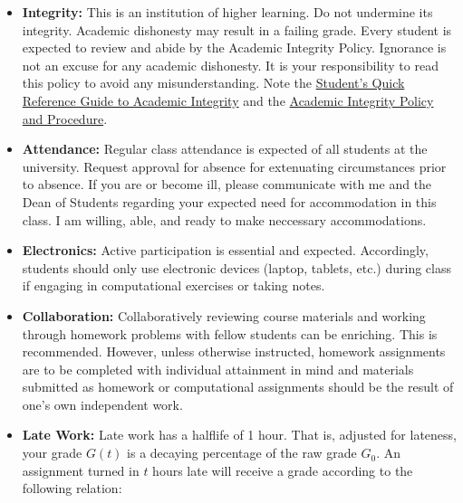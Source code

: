 \documentclass[11pt, a4paper]{article}
\begin{document}
\begin{itemize}
\item[] \textbf{Integrity:} This is an institution of higher learning.
        Do not undermine its integrity. Academic dishonesty may result in a failing grade. 
                Every student is expected to review and abide by the Academic 
                Integrity Policy. Ignorance is not an excuse for any academic 
                dishonesty. It is your responsibility to read this policy to 
                avoid any misunderstanding.  Note the 
                \href{https://provost.illinois.edu/policies/policies/academic-integrity/students-quick-reference-guide-to-academic-integrity/}{Student's 
                Quick Reference Guide to Academic Integrity} and the 
                \href{https://studentcode.illinois.edu/article1/part4/1-401/}{Academic 
                Integrity Policy and Procedure}.
\item[] \textbf{Attendance:} 
        Regular class attendance is expected of all students at the university. 
                Request approval for absence for extenuating circumstances 
                prior to absence.  If you are or become ill, please communicate 
                with me and the Dean of Students regarding your expected need 
                for accommodation in this class. I am willing, able, and ready 
                to make neccessary accommodations.
\item[] \textbf{Electronics:} 
        Active participation is essential and expected.
        Accordingly, students should only use electronic devices (laptop,
        tablets, etc.) during class if engaging in computational 
        exercises or taking notes.
\item[] \textbf{Collaboration:} Collaboratively reviewing course materials and 
        working through homework problems with fellow students can be 
                enriching.  This is recommended.  However, unless otherwise 
                instructed, homework assignments are to be completed with 
                individual attainment in mind and materials submitted as 
                homework or computational assignments should be the result of 
                one's own independent work.
\item[] \textbf{Late Work:} Late work has a halflife of 1 hour. That is, 
        adjusted for lateness, your grade $G(t)$ is a decaying percentage of 
                the raw grade $G_0$. An assignment turned in $t$ hours late 
                will receive a grade according to the following relation:

\end{itemize}
\end{document}

